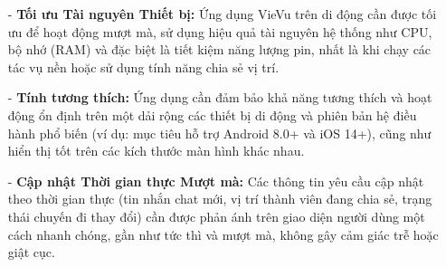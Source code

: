 \begin{itemize}
    \item[-] \textbf{Tối ưu Tài nguyên Thiết bị:} Ứng dụng VieVu trên di động cần được tối ưu để hoạt động mượt mà, sử dụng hiệu quả tài nguyên hệ thống như CPU, bộ nhớ (RAM) và đặc biệt là tiết kiệm năng lượng pin, nhất là khi chạy các tác vụ nền hoặc sử dụng tính năng chia sẻ vị trí.

    \item[-] \textbf{Tính tương thích:} Ứng dụng cần đảm bảo khả năng tương thích và hoạt động ổn định trên một dải rộng các thiết bị di động và phiên bản hệ điều hành phổ biến (ví dụ: mục tiêu hỗ trợ Android 8.0+ và iOS 14+), cũng như hiển thị tốt trên các kích thước màn hình khác nhau.

    \item[-] \textbf{Cập nhật Thời gian thực Mượt mà:} Các thông tin yêu cầu cập nhật theo thời gian thực (tin nhắn chat mới, vị trí thành viên đang chia sẻ, trạng thái chuyến đi thay đổi) cần được phản ánh trên giao diện người dùng một cách nhanh chóng, gần như tức thì và mượt mà, không gây cảm giác trễ hoặc giật cục.

\end{itemize}
